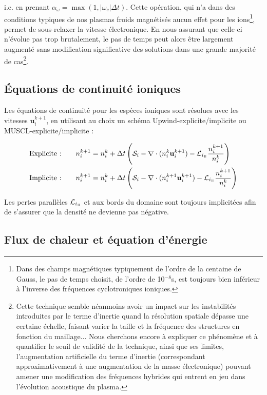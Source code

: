 \begin{refsection}
i.e. en prenant $\alpha_\omega=\max(1,|\omega_c|\Delta t)$.
Cette opération, qui n'a dans des conditions typiques de nos plasmas froids
magnétisés aucun effet pour les ions\footnote{Dans des champs magnétiques
typiquement de l'ordre de la centaine de Gauss, le pas de temps choisit, de l'ordre de 10$^{-8}$s, est toujours bien
inférieur à l'inverse des fréquences cyclotroniques ioniques.}, permet de
sous-relaxer la vitesse électronique. En nous assurant
que celle-ci n'évolue pas trop brutalement, le pas de temps peut alors être
largement augmenté sans modification significative des solutions dans une
grande majorité de cas\footnote{Cette
technique semble néanmoins avoir un impact sur les
instabilités introduites par le terme d'inertie quand la résolution spatiale
dépasse une certaine échelle, faisant varier la taille et la fréquence des
structures en fonction du maillage...
Nous cherchons encore à expliquer ce phénomène et à quantifier le seuil de
validité de la technique, ainsi que ses limites, l'augmentation artificielle du
terme d'inertie (correspondant approximativement à une augmentation de la masse
électronique) pouvant amener une modification des fréquences hybrides qui entrent en jeu dans
l'évolution acoustique du plasma.}.

\subsection{Équations de continuité ioniques}
Les équations de continuité pour les espèces ioniques sont résolues avec les
vitesses $\mathbf u_i^{k+1}$, en utilisant au choix un schéma
Upwind-explicite/implicite ou MUSCL-explicite/implicite :

\begin{align}
\text{Explicite :\qquad}& n_i^{k+1}=n_i^{k}+\Delta
t\left(\mathcal S_i-\nabla\cdot(n_i^{k}\mathbf
u_i^{k+1})-\mathcal L_{i_\para}\frac{n_i^{k+1}}{n_i^k}\right)\\
\text{Implicite :\qquad}&n_i^{k+1}=n_i^{k}+\Delta
t\left(\mathcal S_i-\nabla\cdot(n_i^{k+1}\mathbf
u_i^{k+1})-\mathcal L_{i_\para}\frac{n_i^{k+1}}{n_i^k}\right)
\end{align}

Les pertes parallèles $\mathcal {L}_{i_\para}$ et aux bords du
domaine sont toujours implicitées afin de s'assurer que la densité ne devienne
pas négative.

\subsection{Flux de chaleur et équation d'énergie}


\end{refsection}
